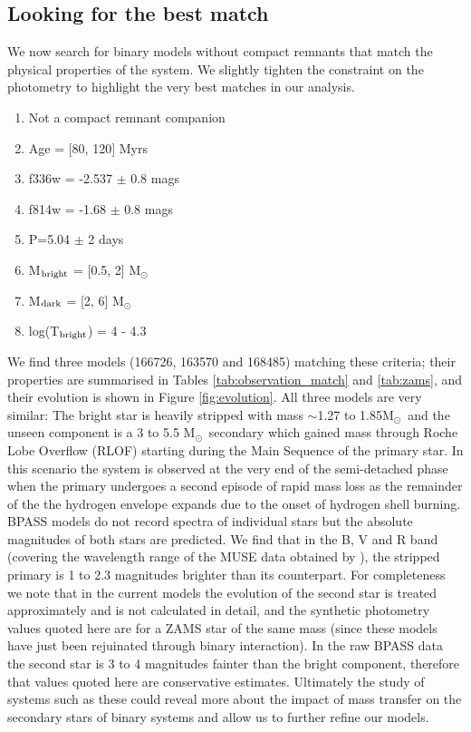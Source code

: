\documentclass[fleqn,usenatbib]{mnras}
\newcommand{\msol} {M$_{\odot}$}
\newcommand{\about} {$\sim$}
\begin{document}
\subsection{Looking for the best match}
We now search for binary models without compact remnants that match the physical properties of the system. We slightly tighten the constraint on the photometry to highlight the very best matches in our analysis. 
\begin{enumerate}
    \item Not a compact remnant companion
    \item Age = [80, 120] Myrs
    \item f336w = -2.537 $\pm$ 0.8 mags
    \item f814w = -1.68 $\pm$ 0.8 mags
    \item P=5.04 $\pm$ 2 days
    \item M$_{\rm bright}$ = [0.5, 2] \msol 
    \item M$_{\rm dark}$ = [2, 6] \msol 
    \item log(T$_{\rm bright}$) = 4 - 4.3  
\end{enumerate}

We find three models (166726, 163570 and 168485) matching these criteria; their properties are summarised in Tables \ref{tab:observation_match} and \ref{tab:zams}, and their evolution is shown in Figure \ref{fig:evolution}. 
All three models are very similar: The bright star is heavily stripped with mass \about 1.27 to 1.85\msol\, and the unseen component is a 3 to 5.5 \msol\, secondary which gained mass through Roche Lobe Overflow (RLOF) starting during the Main Sequence of the primary star. 
In this scenario the system is observed at the very end of the semi-detached phase when the primary undergoes a second episode of rapid mass loss as the remainder of the the hydrogen envelope expands due to the onset of hydrogen shell burning. 
BPASS models do not record spectra of individual stars but the absolute magnitudes of both stars are predicted.
We find that in the B, V and R band (covering the wavelength range of the MUSE data obtained by \citealt{saracino2021}), the stripped primary is 1 to 2.3 magnitudes brighter than its counterpart. 
For completeness we note that in the current models the evolution of the second star is treated approximately and is not calculated in detail, and the synthetic photometry values quoted here are for a ZAMS star of the same mass (since these models have just been rejuinated through binary interaction).
In the raw BPASS data the second star is 3 to 4 magnitudes fainter than the bright component, therefore that values quoted here are conservative estimates. 
Ultimately the study of systems such as these could reveal more about the impact of mass transfer on the secondary stars of binary systems and allow us to further refine our models. 
\end{document}
